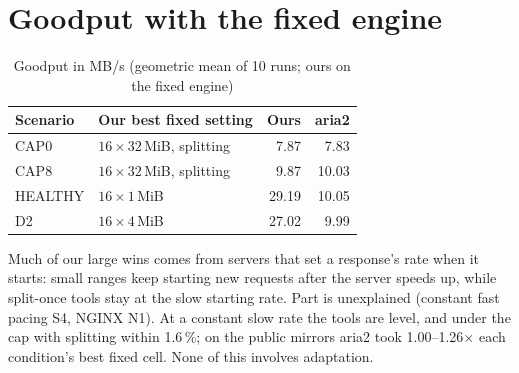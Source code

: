 \section{Goodput with the fixed engine}
\begin{table}[H]\centering\small
\caption{Goodput in MB/s (geometric mean of 10 runs; ours on the fixed engine)}\label{tab:goodput}
\begin{tabular}{@{}llrr@{}}
\toprule
\textbf{Scenario} & \textbf{Our best fixed setting} & \textbf{Ours} & \textbf{aria2}\\
\midrule
CAP0 & $16\times32$\,MiB, splitting & 7.87 & 7.83\\
CAP8 & $16\times32$\,MiB, splitting & 9.87 & 10.03\\
HEALTHY & $16\times1$\,MiB & 29.19 & 10.05\\
D2 & $16\times4$\,MiB & 27.02 & 9.99\\
\bottomrule
\end{tabular}
\end{table}

\begin{keyidea}
Much of our large wins comes from servers that set a response's rate when it starts: small ranges keep starting new requests after the server speeds up, while split-once tools stay at the slow starting rate. Part is unexplained (constant fast pacing S4, NGINX N1). At a constant slow rate the tools are level, and under the cap with splitting within 1.6\,\%; on the public mirrors aria2 took 1.00--1.26$\times$ each condition's best fixed cell. None of this involves adaptation.
\end{keyidea}
